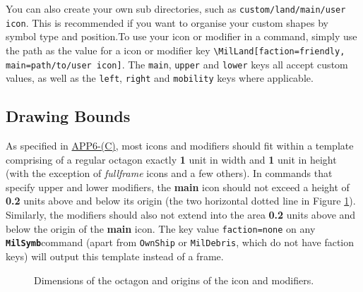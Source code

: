 \documentclass[a4paper, titlepage]{article}
\newcommand\MilSymb{\textbf{\texttt{MilSymb}}}
\newcommand\DocLink{\href{https://www.awl.edu.pl/images/en/APP_6_C.pdf}{APP6-(C)}}
\begin{document}
You can also create your own sub directories, such as \texttt{custom/land/main/user icon}. This is recommended if you want to organise your custom shapes by symbol type and position.To use your icon or modifier in a command, simply use the path as the value for a icon or modifier key \texttt{\textbackslash MilLand[faction=friendly, main=path/to/user icon]}. The \texttt{main}, \texttt{upper} and \texttt{lower} keys all accept custom values, as well as the \texttt{left}, \texttt{right} and \texttt{mobility} keys where applicable.

\subsection{Drawing Bounds}

As specified in \DocLink, most icons and modifiers should fit within a template comprising of a regular octagon exactly \textbf{1} unit in width and \textbf{1} unit in height (with the exception of \textit{fullframe} icons and a few others). In commands that specify upper and lower modifiers, the \textbf{main} icon should not exceed a height of \textbf{0.2} units above and below its origin (the two horizontal dotted line in Figure \ref{octagon}). Similarly, the modifiers should also not extend into the area \textbf{0.2} units above and below the origin of the \textbf{main} icon. The key value \texttt{faction=none} on any \MilSymb command (apart from \texttt{OwnShip} or \texttt{MilDebris}, which do not have faction keys) will output this template instead of a frame.

\begin{figure}[H]
\centering
{}
\caption{Dimensions of the octagon and origins of the icon and modifiers.}
\label{octagon}
\end{figure}
\end{document}
